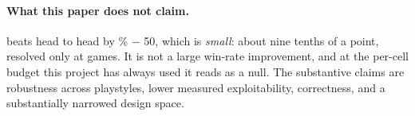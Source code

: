 \paragraph{What this paper does not claim.} \vsix{} beats \vfive{} head to head by
\vsixBigFive\% $-$ 50, which is \emph{small}: about nine tenths of a point, resolved only at
\vsixBigFiveN{} games. It is not a large win-rate improvement, and at the per-cell budget this
project has always used it reads as a null. The substantive claims are robustness across playstyles,
lower measured exploitability, correctness, and a substantially narrowed design space.
